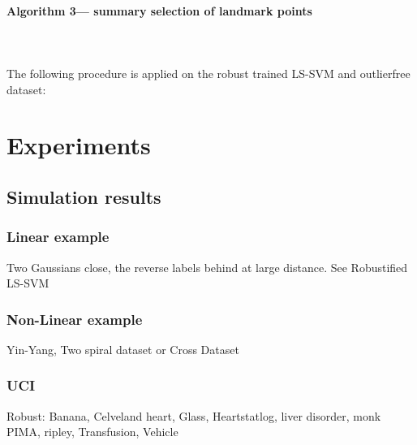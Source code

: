 \documentclass[preprint,12pt]{elsarticle}
\begin{document}
	\paragraph{Algorithm 3--- summary selection of landmark points} 
	\hfill \\\\
	The following procedure is applied on the robust trained LS-SVM and outlierfree dataset:
	
	
	
	\section{Experiments} 
	\subsection{Simulation results} 
	
	\subsubsection{Linear example}
	
	Two Gaussians close, the reverse labels behind at large distance. See Robustified LS-SVM~\cite{debruyne2009robustified}
	
	\subsubsection{Non-Linear example}
	
	Yin-Yang, Two spiral dataset or Cross Dataset~\cite{yang2014robust}
	
	\subsubsection{UCI}
	
	Robust: Banana, Celveland heart, Glass, Heartstatlog, liver disorder, monk PIMA, ripley, Transfusion, Vehicle~\cite{yang2014robust}
	
\end{document}
